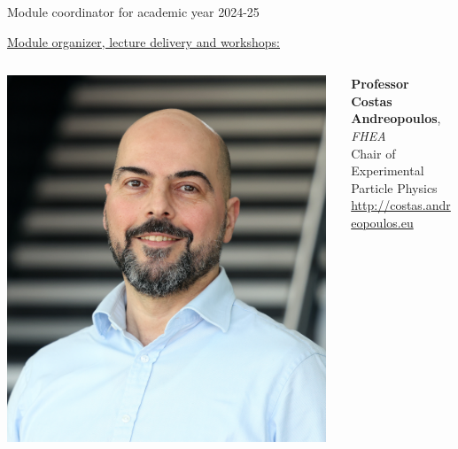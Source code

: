 \begin{frame}{Module coordinator for academic year 2024-25}

\vspace{0.3cm}  
 
\underline{Module organizer, lecture delivery and workshops:}\\
\vspace{0.2cm}
\begin{columns}
  \begin{column}{0.20\textwidth}
   \begin{center}
     \includegraphics[width=0.98\textwidth]{./images/people/andreopoulos_1}\\
   \end{center}
  \end{column}
  \begin{column}{0.80\textwidth}
    {\bf Professor Costas Andreopoulos}, {\it FHEA}\\
    Chair of Experimental Particle Physics\\
    \vspace{0.2cm}
    \href{http://costas.andreopoulos.eu}{http://costas.andreopoulos.eu}\\
  \end{column}
\end{columns}


\end{frame}
